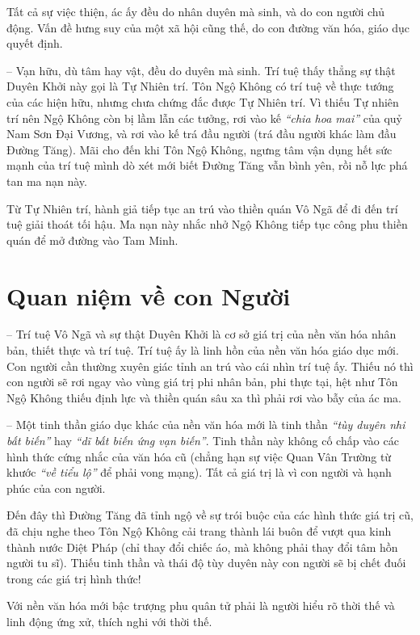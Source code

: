 Tất cả sự việc thiện, ác ấy đều do nhân duyên mà sinh, và do con người chủ động. Vấn đề hưng suy của một xã hội cũng thế, do con đường văn hóa, giáo dục quyết định.

-- Vạn hữu, dù tâm hay vật, đều do duyên mà sinh. Trí tuệ thấy thẳng sự thật Duyên Khởi này gọi là Tự Nhiên trí. Tôn Ngộ Không có trí tuệ về thực tướng của các hiện hữu, nhưng chưa chứng đắc được Tự Nhiên trí. Vì thiếu Tự nhiên trí nên Ngộ Không còn bị lầm lẫn các tưởng, rơi vào kế \emph{``chia hoa mai''} của quỷ Nam Sơn Đại Vương, và rơi vào kế trá đầu người (trá đầu người khác làm đầu Đường Tăng). Mãi cho đến khi Tôn Ngộ Không, ngưng tâm vận dụng hết sức mạnh của trí tuệ mình dò xét mới biết Đường Tăng vẫn bình yên, rồi nỗ lực phá tan ma nạn này.

Từ Tự Nhiên trí, hành giả tiếp tục an trú vào thiền quán Vô Ngã để đi đến trí tuệ giải thoát tối hậu. Ma nạn này nhắc nhở Ngộ Không tiếp tục công phu thiền quán để mở đường vào Tam Minh.

\section{Quan niệm về con Người} %
\label{sec:84_85_con_nguoi}

-- Trí tuệ Vô Ngã và sự thật Duyên Khởi là cơ sở giá trị của nền văn hóa nhân bản, thiết thực và trí tuệ. Trí tuệ ấy là linh hồn của nền văn hóa giáo dục mới. Con người cần thường xuyên giác tỉnh an trú vào cái nhìn trí tuệ ấy. Thiếu nó thì con người sẽ rơi ngay vào vùng giá trị phi nhân bản, phi thực tại, hệt như Tôn Ngộ Không thiếu định lực và thiền quán sâu xa thì phải rơi vào bẫy của ác ma.

-- Một tinh thần giáo dục khác của nền văn hóa mới là tinh thần \emph{``tùy duyên nhi bất biến''} hay \emph{``dĩ bất biến ứng vạn biến''}. Tinh thần này không cố chấp vào các hình thức cứng nhắc của văn hóa cũ (chẳng hạn sự việc Quan Vân Trường từ khước \emph{``về tiểu lộ''} để phải vong mạng). Tất cả giá trị là vì con người và hạnh phúc của con người.

Đến đây thì Đường Tăng đã tỉnh ngộ về sự trói buộc của các hình thức giá trị cũ, đã chịu nghe theo Tôn Ngộ Không cải trang thành lái buôn để vượt qua kinh thành nước Diệt Pháp (chỉ thay đổi chiếc áo, mà không phải thay đổi tâm hồn người tu sĩ). Thiếu tinh thần và thái độ tùy duyên này con người sẽ bị chết đuối trong các giá trị hình thức!

Với nền văn hóa mới bậc trượng phu quân tử phải là người hiểu rõ thời thế và linh động ứng xử, thích nghi với thời thế.

